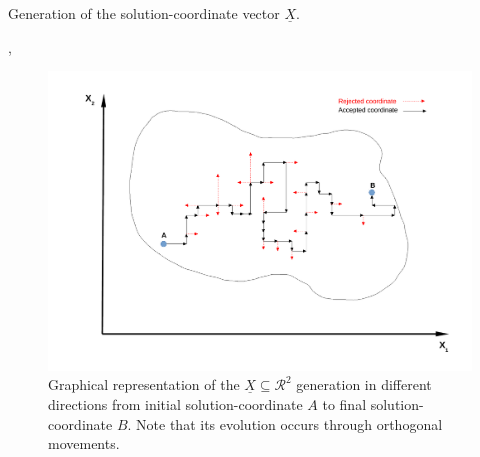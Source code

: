 \begin{table}[h]
   \caption{Generation of the solution-coordinate vector $\underline{X}$.}\label{Chapter:GlobalOpt:Table:XEvolution},
\end{table}

\begin{figure}[h]
          \includegraphics[width=\columnwidth,clip]{./Figs/SimulatedAnnealingAlgorithmOrthogonal}
           \caption{Graphical representation of the $\underline{X}\subseteq\mathcal{R}^{2}$ generation in different directions from initial solution-coordinate $A$ to final solution-coordinate $B$. Note that its evolution occurs through orthogonal movements.} 
\label{Chapter:GlobalOpt:Fig:SimulatedAnnealingAlgorithmOrthogonal}
\end{figure}


